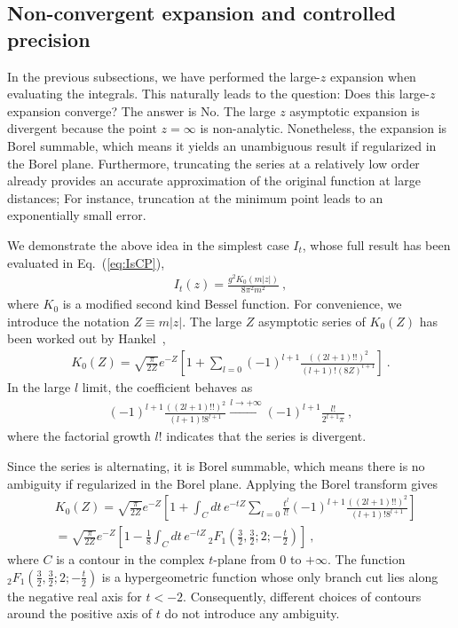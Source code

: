 \documentclass[a4paper,11pt]{article}
\begin{document}
\subsection{Non-convergent expansion and controlled precision}
In the previous subsections, we have performed the large-$z$ expansion when evaluating the integrals. This naturally leads to the question: Does this large-$z$ expansion converge? The answer is No. The large $z$ asymptotic expansion is divergent because the point $z=\infty$ is non-analytic. Nonetheless, the expansion is Borel summable, which means it yields an unambiguous result if regularized in the Borel plane. Furthermore, truncating the series at a relatively low order already provides an accurate approximation of the original function at large distances; For instance, truncation at the minimum point leads to an exponentially small error. 

We demonstrate the above idea in the simplest case $I_{t}$, whose full result has been evaluated in Eq.~(\ref{eq:IsCP}),
\begin{align}
I_{t}(z) = \frac{g^2 K_0( m |z|)}{8 \pi ^2 m^2} \ ,
\end{align}
where $K_0$ is a modified second kind Bessel function. For convenience, we introduce the notation $Z \equiv m|z|$. The large $Z$ asymptotic series of $K_0(Z)$ has been worked out by Hankel~\cite{DLMF_Bessel_Asy,Watson_Bessel_1944},
\begin{align}\label{eq:K0Lz}
K_0(Z) = \sqrt{\frac{\pi}{2 Z}} e^{-Z} \left[ 1 + \sum_{l=0} (-1)^{l+1} \frac{((2l+1)!!)^2}{(l+1)! (8Z)^{l+1}} \right] \ .    
\end{align}
In the large $l$ limit, the coefficient behaves as
\begin{align}
(-1)^{l+1} \frac{((2l+1)!!)^2}{(l+1)! 8^{l+1}} 
\overset{l \rightarrow +\infty}{\rightarrow} 
(-1)^{l+1} \frac{l!}{2^{l+1} \pi} \ ,
\end{align}
where the factorial growth $l!$ indicates that the series is divergent. 

Since the series is alternating, it is Borel summable, which means there is no ambiguity if regularized in the Borel plane. Applying the Borel transform gives
\begin{align}
&K_0(Z) = \sqrt{\frac{\pi}{2 Z}} e^{-Z} \left[ 1 + \int_{C} dt \, e^{-t Z} \sum_{l=0} \frac{t^{l}}{l!} (-1)^{l+1} \frac{((2l+1)!!)^2}{(l+1)! 8^{l+1}} \right] \nonumber\\
&=\sqrt{\frac{\pi}{2 Z}} e^{-Z} \left[ 1 - \frac{1}{8} \int_{C} dt \, e^{-t Z}  \, _2F_1\left(\frac{3}{2},\frac{3}{2};2;-\frac{t}{2}\right) \right] \ ,
\end{align}
where $C$ is a contour in the complex $t$-plane from $0$ to $+\infty$. The function $_2F_1\left(\frac{3}{2},\frac{3}{2};2;-\frac{t}{2}\right)$ is a hypergeometric function whose only branch cut lies along the negative real axis for $t < -2$. Consequently, different choices of contours around the positive axis of $t$ do not introduce any ambiguity. 
\end{document}
